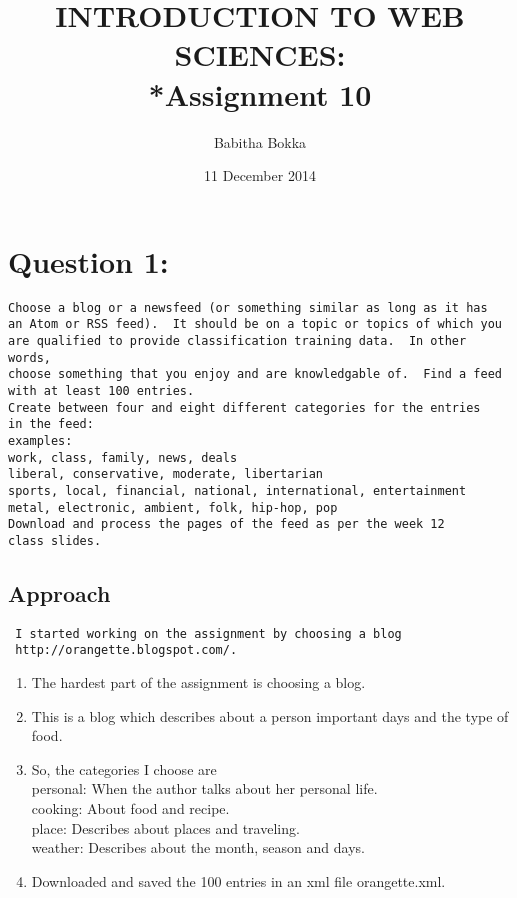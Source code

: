 \documentclass[12pt]{article}
\begin{document}
\begin{titlepage}
\title{INTRODUCTION TO WEB SCIENCES:\\*Assignment 10}
\author{Babitha Bokka}
\date{11 December 2014}
\maketitle
\end{titlepage}

\tableofcontents
\newpage
\section{Question 1:}
\begin{verbatim}
Choose a blog or a newsfeed (or something similar as long as it has
an Atom or RSS feed).  It should be on a topic or topics of which you
are qualified to provide classification training data.  In other words,
choose something that you enjoy and are knowledgable of.  Find a feed
with at least 100 entries.
Create between four and eight different categories for the entries
in the feed:
examples:
work, class, family, news, deals
liberal, conservative, moderate, libertarian
sports, local, financial, national, international, entertainment
metal, electronic, ambient, folk, hip-hop, pop
Download and process the pages of the feed as per the week 12 
class slides.
\end{verbatim}

\subsection{Approach}
\begin{verbatim}
 I started working on the assignment by choosing a blog
 http://orangette.blogspot.com/.
\end{verbatim}
\begin{enumerate}
\item The hardest part of the assignment is choosing a blog.
 \item This is a blog which describes about a person important days and the type of food.
 \item So, the categories I choose are\\
  personal: When the author talks about her personal life.\\
  cooking: About food and recipe.\\
  place:   Describes about places and traveling.\\
  weather: Describes about the month, season and days.
  \item Downloaded and saved the 100 entries in an xml file orangette.xml. 
\end{enumerate}   
\newpage
\end{document}
